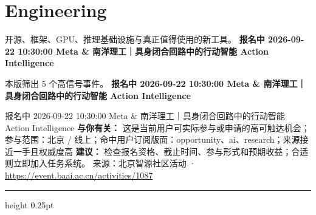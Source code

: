 \documentclass[10.5pt]{ctexart}
\begin{document}
\section*{Engineering}
{\color{ormuted} 开源、框架、GPU、推理基础设施与真正值得使用的新工具。}
\vspace{2mm}
{\LARGE\bfseries 报名中 2026-09-22 10:30:00 Meta \& 南洋理工｜具身闭合回路中的行动智能 Action Intelligence}\par
\vspace{1mm}
{\color{ormuted} 本版筛出 5 个高信号事件。}
\vspace{3mm}
{\Large\bfseries 报名中 2026-09-22 10:30:00 Meta \& 南洋理工｜具身闭合回路中的行动智能 Action Intelligence}\par
报名中 2026-09-22 10:30:00 Meta \& 南洋理工｜具身闭合回路中的行动智能 Action Intelligence
\textbf{与你有关：} 这是当前用户可实际参与或申请的高可触达机会；参与范围：北京 / 线上；命中用户订阅版面：opportunity、ai、research；来源接近一手且权威度高
\textbf{建议：} 检查报名资格、截止时间、参与形式和预期收益；合适则立即加入任务系统。
{\footnotesize\color{ormuted} 来源：北京智源社区活动 · \url{https://event.baai.ac.cn/activities/1087}}
\vspace{4mm}
\hrule height 0.25pt
\vspace{3mm}
\end{document}
